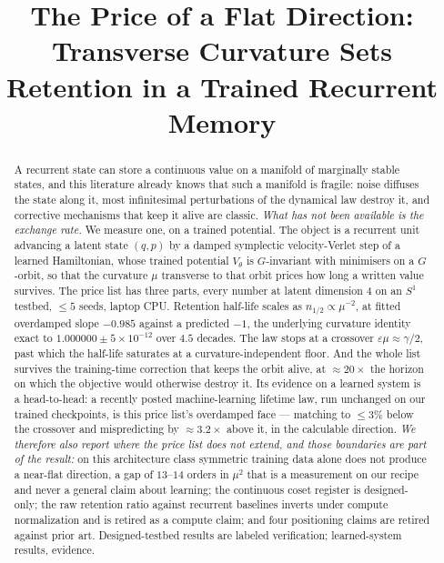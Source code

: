 \documentclass{article}
\title{The Price of a Flat Direction:\\ Transverse Curvature Sets Retention in a Trained Recurrent Memory}
\author{}
\begin{document}
\maketitle


\begin{abstract}
A recurrent state can store a continuous value on a manifold of marginally stable states, and this literature already knows that such a manifold is fragile: noise diffuses the state along it, most infinitesimal perturbations of the dynamical law destroy it, and corrective mechanisms that keep it alive are classic. \emph{What has not been available is the exchange rate.} We measure one, on a trained potential. The object is a recurrent unit advancing a latent state $(q,p)$ by a damped symplectic velocity-Verlet step of a learned Hamiltonian, whose trained potential $V_\theta$ is $G$-invariant with minimisers on a $G$-orbit, so that the curvature $\mu$ transverse to that orbit prices how long a written value survives. The price list has three parts, every number at latent dimension $4$ on an $S^1$ testbed, $\le5$ seeds, laptop CPU. Retention half-life scales as $n_{1/2}\propto\mu^{-2}$, at fitted overdamped slope $-0.985$ against a predicted $-1$, the underlying curvature identity exact to $1.000000\pm5\!\times\!10^{-12}$ over $4.5$ decades. The law stops at a crossover $\varepsilon\mu\approx\gamma/2$, past which the half-life saturates at a curvature-independent floor. And the whole list survives the training-time correction that keeps the orbit alive, at $\approx20\times$ the horizon on which the objective would otherwise destroy it. Its evidence on a learned system is a head-to-head: a recently posted machine-learning lifetime law, run unchanged on our trained checkpoints, is this price list's overdamped face --- matching to $\le3\%$ below the crossover and mispredicting by $\approx3.2\times$ above it, in the calculable direction. \emph{We therefore also report where the price list does not extend, and those boundaries are part of the result:} on this architecture class symmetric training data alone does not produce a near-flat direction, a gap of $13$--$14$ orders in $\mu^2$ that is a measurement on our recipe and never a general claim about learning; the continuous coset register is designed-only; the raw retention ratio against recurrent baselines inverts under compute normalization and is retired as a compute claim; and four positioning claims are retired against prior art. Designed-testbed results are labeled verification; learned-system results, evidence.
\end{abstract}
\end{document}
